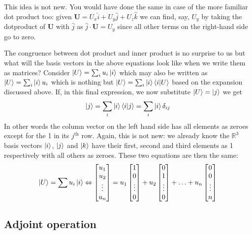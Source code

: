 \documentclass[english,seminar,headertitle]{lecture}
\begin{document}
This idea is not new. You would have done the same in case of the more familiar dot product too: given $\mathbf{U} = U_x \hat{i} + U_y \hat{j} + U_z \hat{k}$ we can find, say, $U_y$ by taking the dotproduct of $\mathbf{U}$ with $\hat{j}$ as $\hat{j} \cdot \mathbf{U} = U_y $ since all other terms on the right-hand side go to zero.

The congruence between dot product and inner product is no surprise to us but what will the basis vectors in the above equations look like when we write them as matrices? Consider $\ket{U} = \sum_i u_i \ket{i}$ which may also be written as $\ket{U} = \sum_i \ket{i} u_i$ which is nothing but $\ket{U} = \sum_i \ket{i}\braket{i | U}$ based on the expansion discussed above. If, in this final expression, we now substitute $\ket{U} = \ket{j}$ we get
\[
	\ket{j} = \sum_i \ket{i}\braket{i | j} = \sum_i \ket{i}\delta_{ij}
\]
In other words the column vector on the left hand side has all elements as zeroes except for the 1 in its $j^\textrm{th}$ row. Again, this is not new: we already know the $\mathbb{R}^3$ basis vectors $\ket{i}$, $\ket{j}$ and $\ket{k}$ have their first, second and third elements as 1 respectively with all others as zeroes. These two equations are then the same:
\begin{equation}
	\ket{U} = \sum{u_i}\ket{i} \Leftrightarrow
	\begin{bmatrix}
		u_1 \\ u_2 \\ \vdots \\ u_n
	\end{bmatrix}
	=
	u_1
	\begin{bmatrix}
		1 \\ 0 \\ \vdots \\ 0
	\end{bmatrix}
	+
	u_2
	\begin{bmatrix}
		0 \\ 1 \\ \vdots \\ 0
	\end{bmatrix}
	+
	\ldots
	+
	u_n
	\begin{bmatrix}
		0 \\ 0 \\ \vdots \\ n
	\end{bmatrix}
\end{equation}

\subsection{Adjoint operation}
\end{document}
